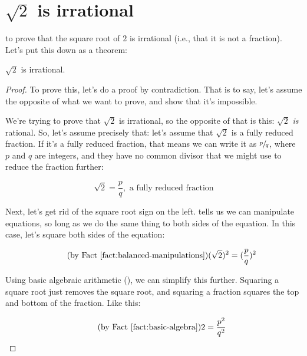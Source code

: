 \documentclass[../../../main.tex]{subfiles}
\begin{document}
\section{$\sqrt{2}$ is irrational}

 to prove that the square root of $2$ is irrational (i.e., that it is not a fraction). Let's put this down as a theorem:

\begin{theorem}
  \label{theorem:square-root-of-two-is-irrational}
  $\sqrt{2}$ is irrational.
\end{theorem}

\begin{proof}

To prove this, let's do a proof by contradiction. That is to say, let's assume the opposite of what we want to prove, and show that it's impossible. 

We're trying to prove that $\sqrt{2}$ is irrational, so the opposite of that is this: $\sqrt{2}$ \emph{is} rational. So, let's assume precisely that: let's assume that $\sqrt{2}$ is a fully reduced fraction. If it's a fully reduced fraction, that means we can write it as $\sfrac{p}{q}$, where $p$ and $q$ are integers, and they have no common divisor that we might use to reduce the fraction further:

\begin{equation*}
  \tag{Assumption}
  \sqrt{2} = \frac{p}{q}, \text{ a fully reduced fraction}
\end{equation*}

Next, let's get rid of the square root sign on the left.  tells us we can manipulate equations, so long as we do the same thing to both sides of the equation. In this case, let's square both sides of the equation:

\begin{equation*}
  \tag{by \factref{fact:balanced-manipulations}}
  (\sqrt{2})^{2} = (\frac{p}{q})^{2}
\end{equation*}

Using basic algebraic arithmetic (), we can simplify this further. Squaring a square root just removes the square root, and squaring a fraction squares the top and bottom of the fraction. Like this:

\begin{equation*}
  \tag{by \factref{fact:basic-algebra}}
  2 = \frac{p^{2}}{q^{2}}
\end{equation*}


\end{proof}
\end{document}
